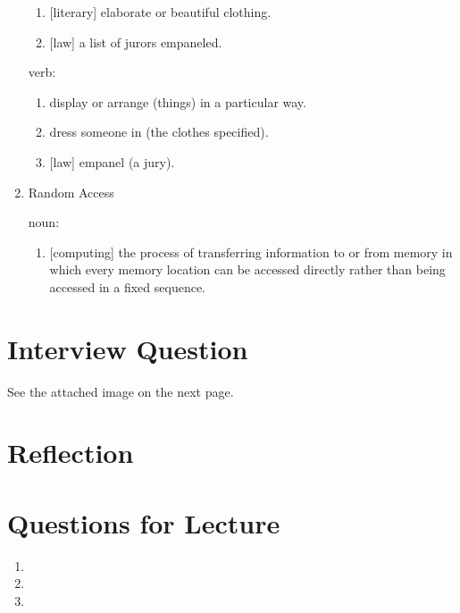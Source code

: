 \documentclass[12pt]{article}
\numberwithin{figure}{subsection}
\numberwithin{table}{subsection}
\numberwithin{equation}{subsection}
\begin{document}
\begin{enumerate}
\begin{enumerate}
    \item {[literary]} elaborate or beautiful clothing.
    \item {[law]} a list of jurors empaneled.
  \end{enumerate}

  verb:

  \begin{enumerate}
    \item display or arrange (things) in a particular way.
    \item dress someone in (the clothes specified).
    \item {[law]} empanel (a jury).
  \end{enumerate}

  \item{Random Access}

  noun:

  \begin{enumerate}
    \item {[computing]} the process of transferring information to or from memory in which every memory location can be accessed directly rather than being accessed in a fixed sequence.
  \end{enumerate}
\end{enumerate}

\section{Interview Question}

See the attached image on the next page.

% 

\section{Reflection}

\section{Questions for Lecture}

\begin{enumerate}
  \item
  \item
  \item
\end{enumerate}
\end{document}
